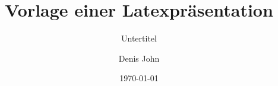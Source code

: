 

\author{Denis John}

\title[Vorlage]{Vorlage einer Latexpräsentation}


\date{\today}










\subtitle[UT-kurz]{Untertitel}


